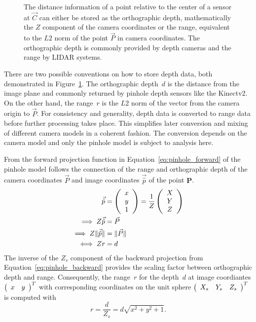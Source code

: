 \begin{figure}[H]
    \scalebox{0.8}{%
    
    }
    \caption[Orthographic Depth and Range visualized]{The distance information of a point relative to the center of a sensor at $\vec{C}$ can either be stored as the orthographic depth, mathematically the $Z$ component of the camera coordinates or the range, equivalent to the $L2$ norm of the point $\vec{P}$ in camera coordinates. The orthographic depth is commonly provided by depth cameras and the range by \acrshort{LIDAR} systems.}
    \label{fig:range_depth}
\end{figure}

There are two possible conventions on how to store depth data, both demonstrated in Figure~\ref{fig:range_depth}.
The orthographic depth~$d$ is the distance from the image plane and commonly returned by pinhole depth sensors like the Kinectv2.
On the other hand, the range~$r$ is the $L2$ norm of the vector from the camera origin to $\vec{P}$.
For consistency and generality, depth data is converted to range data before further processing takes place.
This simplifies later conversion and mixing of different camera models in a coherent fashion.
The conversion depends on the camera model and only the pinhole model is subject to analysis here.

From the forward projection function in Equation~\ref{eq:pinhole_forward} of the pinhole model follows the connection of the range and orthographic depth of the camera coordinates $\vec{P}$ and image coordinates $\vec{\hat{p}}$ of the point $\mathbf{P}$.
\begin{equation}
\begin{aligned}
    \vec{\hat{p}} &= \left(\begin{array}{c} x \\ y \\ 1 \end{array}\right) = \frac{1}{Z}\left(\begin{array}{c} X \\ Y \\ Z \end{array}\right) \\
    \implies Z \vec{\hat{p}} &= \vec{P} \\
    \implies Z \lVert\vec{\hat{p}}\rVert &= \lVert\vec{P}\rVert \\
    \iff Z r &= d
\end{aligned}
\end{equation}
The inverse of the $Z_{s}$ component of the backward projection from Equation~\ref{eq:pinhole_backward} provides the scaling factor between orthographic depth and range.
Consequently, the range~$r$ for the depth~$d$ at image coordiantes $\left(\begin{array}{cc} x & y \end{array}\right)^T$ with corresponding coordinates on the unit sphere $\left(\begin{array}{ccc} X_s & Y_s & Z_s \end{array}\right)^T$ is computed with
\begin{equation}
    r = \frac{d}{Z_s} = d \sqrt{x^2 + y^2 + 1}\text{.}
\end{equation}
